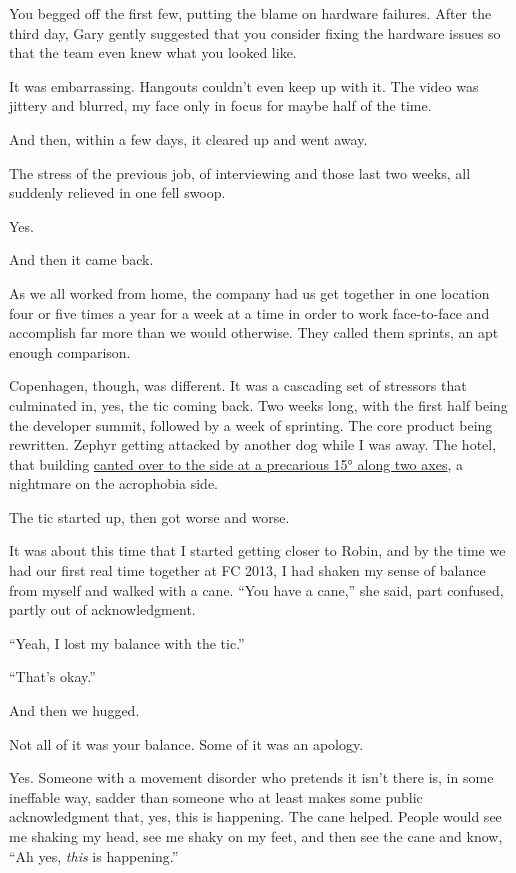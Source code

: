 \begin{paracol}{2}
\begin{leftcolumn}
\begin{ally}
You begged off the first few, putting the blame on hardware failures. After the third day, Gary gently suggested that you consider fixing the hardware issues so that the team even knew what you looked like.
\end{ally}
It was embarrassing. Hangouts couldn't even keep up with it. The video was jittery and blurred, my face only in focus for maybe half of the time.

And then, within a few days, it cleared up and went away.

\begin{ally}
The stress of the previous job, of interviewing and those last two weeks, all suddenly relieved in one fell swoop.
\end{ally}
Yes.

\begin{ally}
And then it came back.
\end{ally}
As we all worked from home, the company had us get together in one location four or five times a year for a week at a time in order to work face-to-face and accomplish far more than we would otherwise. They called them sprints, an apt enough comparison.

Copenhagen, though, was different. It was a cascading set of stressors that culminated in, yes, the tic coming back. Two weeks long, with the first half being the developer summit, followed by a week of sprinting. The core product being rewritten. Zephyr getting attacked by another dog while I was away. The hotel, that building \href{/movement/copenhotel.jpg}{canted over to the side at a precarious 15° along two axes}, a nightmare on the acrophobia side.

The tic started up, then got worse and worse.

It was about this time that I started getting closer to Robin, and by the time we had our first real time together at FC 2013, I had shaken my sense of balance from myself and walked with a cane. ``You have a cane,'' she said, part confused, partly out of acknowledgment.

``Yeah, I lost my balance with the tic.''

``That's okay.''

And then we hugged.

\begin{ally}
Not all of it was your balance. Some of it was an apology.
\end{ally}
Yes. Someone with a movement disorder who pretends it isn't there is, in some ineffable way, sadder than someone who at least makes some public acknowledgment that, yes, this is happening. The cane helped. People would see me shaking my head, see me shaky on my feet, and then see the cane and know, ``Ah yes, \emph{this} is happening.''


\end{leftcolumn}
\end{paracol}
